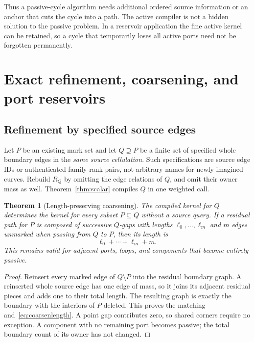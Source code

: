 \documentclass[11pt]{article}
\newtheorem{theorem}{Theorem}[section]
\theoremstyle{definition}\newtheorem{definition}[theorem]{Definition}\newtheorem{example}[theorem]{Example}
\theoremstyle{remark}\newtheorem{remark}[theorem]{Remark}
\begin{document}
Thus a passive-cycle algorithm needs additional ordered source information or an anchor that cuts the cycle into a path. The active compiler is not a hidden solution to the passive problem. In a reservoir application the fine active kernel can be retained, so a cycle that temporarily loses all active ports need not be forgotten permanently.

\section{Exact refinement, coarsening, and port reservoirs}
\label{sec:reservoir}
\subsection{Refinement by specified source edges}
Let $P$ be an existing mark set and let $Q\supseteq P$ be a finite set of specified whole boundary edges in the \emph{same source cellulation}. Such specifications are source edge IDs or authenticated family-rank pairs, not arbitrary names for newly imagined curves. Rebuild $R_Q$ by omitting the edge relations of $Q$, and omit their owner mass as well. Theorem~\ref{thm:scalar} compiles $Q$ in one weighted call.

\begin{theorem}[Length-preserving coarsening]
\label{thm:coarsen}
The compiled kernel for $Q$ determines the kernel for every subset $P\subseteq Q$ without a source query. If a residual path for $P$ is composed of successive $Q$-gaps with lengths $\ell_0,\ldots,\ell_m$ and $m$ edges unmarked when passing from $Q$ to $P$, then its length is
\begin{equation}\label{eq:coarsenlength}
                           \ell_0+\cdots+\ell_m+m.
\end{equation}
This remains valid for adjacent ports, loops, and components that become entirely passive.
\end{theorem}
\begin{proof}
Reinsert every marked edge of $Q\setminus P$ into the residual boundary graph. A reinserted whole source edge has one edge of mass, so it joins its adjacent residual pieces and adds one to their total length. The resulting graph is exactly the boundary with the interiors of $P$ deleted. This proves the matching and~\eqref{eq:coarsenlength}. A point gap contributes zero, so shared corners require no exception. A component with no remaining port becomes passive; the total boundary count of its owner has not changed.
\end{proof}
\end{document}
